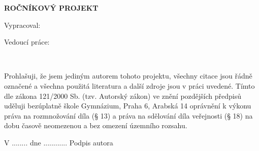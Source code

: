
\pagestyle{empty}
\hypersetup{pageanchor=false}

\begin{center}

{\LARGE\bfseries\NazevSkoly}

\vspace{-18mm}
\vfill

{\LARGE\NazevOboru}

\vfill

\centerline{\mbox{\def\svgwidth{\columnwidth}\scalebox{0.25}{}}}

\vspace{-8mm}
\vfill

{\bf\Large ROČNÍKOVÝ PROJEKT}

\vfill


\vspace{15mm}

{\LARGE\bfseries\NazevPrace}


\vfill


Vypracoval: \hfill \AutorPrace

Vedoucí práce: \hfill \Vedouci

\vspace{15mm}
\MesicOdevzdani \ \RokOdevzdani

\end{center}



\newpage
\hypersetup{pageanchor=true}
\pagestyle{plain}


\openright


\vspace*{\fill}


\noindent
Prohlašuji, že jsem jediným autorem tohoto projektu, všechny citace jsou
řádně označené a všechna použitá literatura a další zdroje jsou v práci uvedené.
Tímto dle zákona 121/2000 Sb. (tzv. Autorský zákon) ve znění pozdějších předpisů uděluji
bezúplatně škole Gymnázium, Praha 6, Arabská 14 oprávnění k výkonu práva na rozmnožování díla
(§ 13) a práva na sdělování díla veřejnosti (§ 18) na dobu časově neomezenou a bez omezení
územního rozsahu.


\vspace{1cm}

\noindent
V ........ dne ............
\hspace{4cm}
Podpis autora


\newpage


\openright

